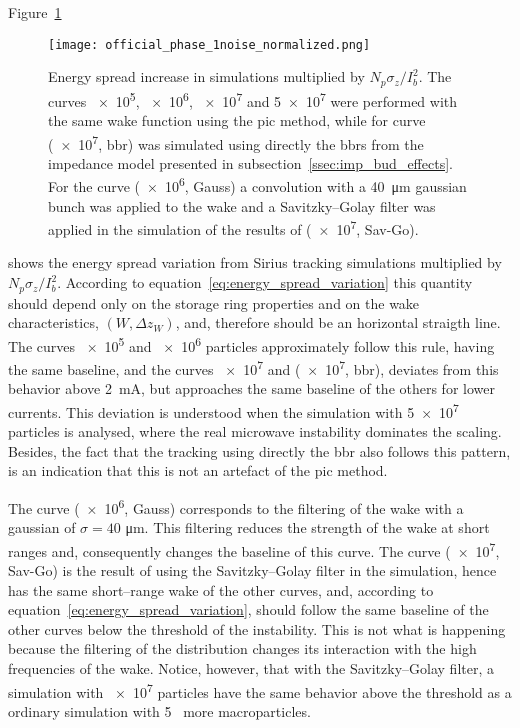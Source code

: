     Figure~\ref{fig:noise_effect}
    \begin{figure}
        \centering
        \texttt{[image: official\_phase\_1noise\_normalized.png]}
        \caption[Normalized energy spread increase in Simulations induced by noise.]{Energy spread increase in simulations multiplied by $N_p\sigma_z/I_b^2$. The curves \num{e5}, \num{e6}, \num{e7} and \num{5e7} were performed with the same wake function using the \gls{pic} method, while for curve (\num{e7}, \gls{bbr}) was simulated using directly the \glspl{bbr} from the impedance model presented in subsection~\ref{ssec:imp_bud_effects}.
        For the curve (\num{e6}, Gauss) a convolution with a \SI{40}{\micro\meter} gaussian bunch was applied to the wake and a Savitzky--Golay filter was applied in the simulation of the results of (\num{e7}, Sav-Go).}
        \label{fig:noise_effect}
    \end{figure}
    shows the energy spread variation from Sirius tracking simulations multiplied by $N_p\sigma_z/I_b^2$. According to equation~\eqref{eq:energy_spread_variation} this quantity should depend only on the storage ring properties and on the wake characteristics, $(W, \Delta z_W)$, and, therefore should be an horizontal straigth line. The curves \num{e5} and \num{e6} particles approximately follow this rule, having the same baseline, and the curves \num{e7} and (\num{e7}, \gls{bbr}), deviates from this behavior above \SI{2}{\milli\ampere}, but approaches the same baseline of the others for lower currents. This deviation is understood when the simulation with \num{5e7} particles is analysed, where the real microwave instability dominates the scaling. Besides, the fact that the tracking using directly the \gls{bbr} also follows this pattern, is an indication that this is not an artefact of the \gls{pic} method.

    The curve (\num{e6}, Gauss) corresponds to the filtering of the wake with a gaussian of $\sigma=40$ \si{\micro\meter}. This filtering reduces the strength of the wake at short ranges and, consequently changes the baseline of this curve. The curve (\num{e7}, Sav-Go) is the result of using the Savitzky--Golay filter in the simulation, hence has the same short--range wake of the other curves, and, according to equation~\eqref{eq:energy_spread_variation}, should follow the same baseline of the other curves below the threshold of the instability. This is not what is happening because the filtering of the distribution changes its interaction with the high frequencies of the wake. Notice, however, that with the Savitzky--Golay filter, a simulation with \num{e7} particles have the same behavior above the threshold as a ordinary simulation with \si{5\times} more macroparticles.

